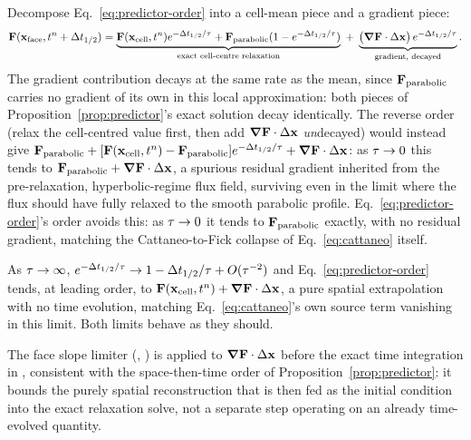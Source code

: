 \begin{remark}
\label{rem:reverse-order-wrong}
Decompose Eq.~\eqref{eq:predictor-order} into a cell-mean piece and a
gradient piece:
\begin{equation}
  \mathbf{F}(\mathbf x_{\rm face},t^n+\Delta t_{1/2}) =
  \underbrace{\mathbf{F}(\mathbf x_{\rm cell},t^n)e^{-\Delta t_{1/2}/\tau}
  +\mathbf{F}_{\rm parabolic}(1-e^{-\Delta t_{1/2}/\tau})}_{\text{exact cell-centre relaxation}}
  \;+\;
  \underbrace{\big(\grad\mathbf{F}\cdot\Delta\mathbf x\big)\,e^{-\Delta t_{1/2}/\tau}}_{\text{gradient, decayed}} .
\end{equation}
The gradient contribution decays at the same rate as the mean, since
$\mathbf{F}_{\rm parabolic}$ carries no gradient of its own in this local
approximation: both pieces of Proposition~\ref{prop:predictor}'s exact
solution decay identically. The reverse order (relax the cell-centred
value first, then
add $\grad\mathbf{F}\cdot\Delta\mathbf x$ \emph{un}decayed) would instead give
$\mathbf{F}_{\rm parabolic}+[\mathbf{F}(\mathbf x_{\rm cell},t^n)-\mathbf{F}_{\rm parabolic}]e^{-\Delta t_{1/2}/\tau}
+\grad\mathbf{F}\cdot\Delta\mathbf x$: as $\tau\to0$ this tends to
$\mathbf{F}_{\rm parabolic}+\grad\mathbf{F}\cdot\Delta\mathbf x$, a spurious residual
gradient inherited from the pre-relaxation, hyperbolic-regime flux field,
surviving even in the limit where the flux should have fully relaxed to
the smooth parabolic profile. Eq.~\eqref{eq:predictor-order}'s order
avoids this: as $\tau\to0$ it tends to $\mathbf{F}_{\rm parabolic}$ exactly, with no
residual gradient, matching the Cattaneo-to-Fick collapse of
Eq.~\eqref{eq:cattaneo} itself.
\end{remark}

\begin{remark}
As $\tau\to\infty$, $e^{-\Delta t_{1/2}/\tau}\to1-\Delta t_{1/2}/\tau+O(\tau^{-2})$
and Eq.~\eqref{eq:predictor-order} tends, at leading order, to
$\mathbf{F}(\mathbf x_{\rm cell},t^n)+\grad\mathbf{F}\cdot\Delta\mathbf x$, a
pure spatial extrapolation with no time evolution, matching
Eq.~\eqref{eq:cattaneo}'s own source term vanishing in this limit. Both
limits behave as they should.
\end{remark}

The face slope limiter (,
) is applied to
$\grad\mathbf{F}\cdot\Delta\mathbf x$ before the exact time integration in
, consistent
with the space-then-time order of Proposition~\ref{prop:predictor}: it
bounds the purely spatial reconstruction that is then fed as the initial
condition into the exact relaxation solve, not a separate step operating
on an already time-evolved quantity.


